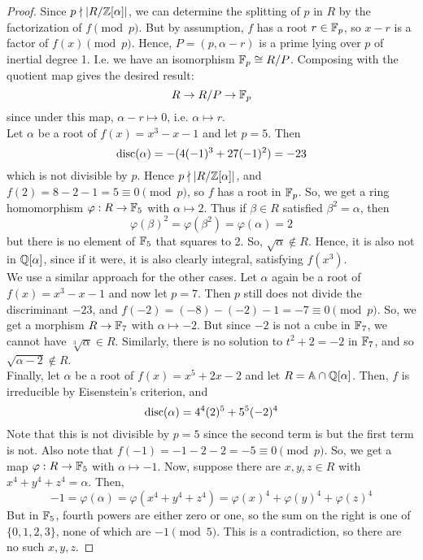 \begin{proof}
	Since $p \nmid |R/\mathbb{Z}[\alpha]|$, we can determine the splitting of $p$ in $R$ by the factorization of $f \pmod{p}$. But by assumption, $f$ has a root $r \in \mathbb{F}_p$, so $x-r$ is a factor of $f(x) \pmod{p}$. Hence, $P = (p,\alpha-r)$ is a prime lying over $p$ of inertial degree 1. I.e. we have an isomorphism $\mathbb{F}_p \cong R/P$. Composing with the quotient map gives the desired result:
	\[ R \to R/P \to \mathbb{F}_p \]
	since under this map, $\alpha-r \mapsto 0$, i.e. $\alpha \mapsto r$. \\
	
	Let $\alpha$ be a root of $f(x) = x^3-x-1$ and let $p=5$. Then
	\[ \operatorname{disc}(\alpha) = -(4(-1)^3+27(-1)^2) = -23 \]
	which is not divisible by $p$. Hence $p \nmid |R/\mathbb{Z}[\alpha]|$, and $f(2) = 8-2-1 = 5 \equiv 0 \pmod{p}$, so $f$ has a root in $\mathbb{F}_p$. So, we get a ring homomorphism $\varphi : R \to \mathbb{F}_5$ with $\alpha \mapsto 2$. Thus if $\beta \in R$ satisfied $\beta^2 = \alpha$, then
	\[ \varphi(\beta)^2 = \varphi(\beta^2) = \varphi(\alpha) = 2 \]
	but there is no element of $\mathbb{F}_5$ that squares to 2. So, $\sqrt{\alpha} \notin R$. Hence, it is also not in $\mathbb{Q}[\alpha]$, since if it were, it is also clearly integral, satisfying $f(x^3)$. \\
	
	We use a similar approach for the other cases. Let $\alpha$ again be a root of $f(x) = x^3-x-1$ and now let $p=7$. Then $p$ still does not divide the discriminant $-23$, and $f(-2) = (-8)-(-2)-1 = -7 \equiv 0 \pmod{p}$. So, we get a morphism $R \to \mathbb{F}_7$ with $\alpha \mapsto -2$. But since $-2$ is not a cube in $\mathbb{F}_7$, we cannot have $\sqrt[3]{\alpha} \in R$. Similarly, there is no solution to $t^2+2 = -2$ in $\mathbb{F}_7$, and so $\sqrt{\alpha-2} \notin R$. \\
	
	Finally, let $\alpha$ be a root of $f(x) = x^5+2x-2$ and let $R = \mathbb{A} \cap \mathbb{Q}[\alpha]$. Then, $f$ is irreducible by Eisenstein's criterion, and
	\[ \operatorname{disc}(\alpha) = 4^4(2)^5 + 5^5(-2)^4 \]
	Note that this is not divisible by $p=5$ since the second term is but the first term is not. Also note that $f(-1) = -1-2-2 = -5 \equiv 0 \pmod{p}$. So, we get a map $\varphi : R \to \mathbb{F}_5$ with $\alpha \mapsto -1$. Now, suppose there are $x,y,z \in R$ with $x^4+y^4+z^4=\alpha$. Then,
	\[ -1 = \varphi(\alpha) = \varphi(x^4+y^4+z^4) = \varphi(x)^4 + \varphi(y)^4 + \varphi(z)^4 \]
	But in $\mathbb{F}_5$, fourth powers are either zero or one, so the sum on the right is one of $\{0,1,2,3\}$, none of which are $-1 \pmod{5}$. This is a contradiction, so there are no such $x,y,z$.
\end{proof}
